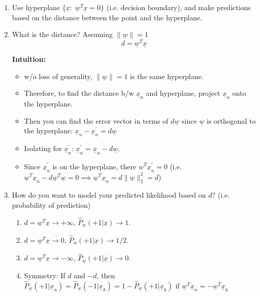     \begin{derivation}
        \begin{enumerate}
            \item Use hyperplane $\{\underline{x}: \; \underline{w}^T \underline{x} = 0\}$ (i.e. decision boundary), and make predictions based on the distance between the point and the hyperplane.
            \item What is the distance? Assuming $\|\underline{w}\| = 1$
            \begin{equation}
                d = \underline{w}^T \underline{x}
            \end{equation}

            \textbf{Intuition:} 
            \begin{itemize}
                \item w/o loss of generality, $\|\underline{w}\| = 1$ is the same hyperplane. 
                \item Therefore, to find the distance b/w $\underline{x}_n$ and hyperplane, project $\underline{x}_n$ onto the hyperplane. 
                \item Then you can find the error vector in terms of $d \underline{w}$ since $\underline{w}$ is orthogonal to the hyperplane: $\underline{x}_n -\underline{x}_n^{'} = d\underline{w}$
                \item Isolating for $\underline{x}_n^{'}$: $\underline{x}_n^{'} = \underline{x}_n - d\underline{w}$. 
                \item Since $\underline{x}_n^{'}$ is on the hyperplane, there $w^T \underline{x}_n^{'} = 0$ (i.e. $\underline{w}^T \underline{x}_n - d \underline{w}^T \underline{w} = 0 \implies \underline{w}^T \underline{x}_n = d \|\underline{w}\|_2^2 = d$)
            \end{itemize}
            \item How do you want to model your predicted likelihood based on $d$? (i.e. probability of prediction)
            \begin{enumerate}
                \item $d=\underline{w}^T \underline{x} \rightarrow +\infty$, $\hat{P}_{\underline{w}}(+1|\underline{x}) \rightarrow 1$.
                \item $d=\underline{w}^T \underline{x} \rightarrow 0$, $\hat{P}_{\underline{w}}(+1|\underline{x}) \rightarrow 1/2$.
                \item $d=\underline{w}^T \underline{x} \rightarrow -\infty$, $\hat{P}_{\underline{w}}(+1|\underline{x}) \rightarrow 0$.
                \item Symmetry: If $d$ and $-d$, then $\hat{P}_{\underline{w}}(+1|\underline{x}_n) = \hat{P}_{\underline{w}}(-1|\underline{x}_k) = 1 - \hat{P}_{\underline{w}}(+1|\underline{x}_k)$ if $\underline{w}^T \underline{x}_n = - \underline{w}^T \underline{x}_k$
            \end{enumerate}
        \end{enumerate}
    
    \end{derivation}

